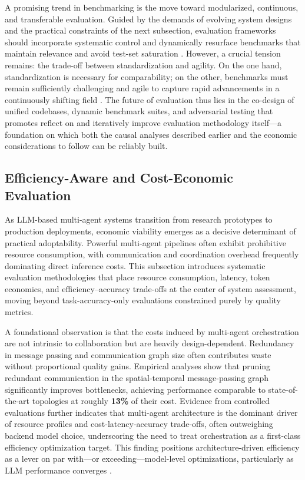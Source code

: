 \documentclass[11pt,a4paper]{article}
\begin{document}
A promising trend in benchmarking is the move toward modularized, continuous, and transferable evaluation. Guided by the demands of evolving system designs and the practical constraints of the next subsection, evaluation frameworks should incorporate systematic control and dynamically resurface benchmarks that maintain relevance and avoid test-set saturation \cite{arxiv:2507.21504v1}. However, a crucial tension remains: the trade-off between standardization and agility. On the one hand, standardization is necessary for comparability; on the other, benchmarks must remain sufficiently challenging and agile to capture rapid advancements in a continuously shifting field \cite{arxiv:2503.16416v2}. The future of evaluation thus lies in the co-design of unified codebases, dynamic benchmark suites, and adversarial testing that promotes reflect on and iteratively improve evaluation methodology itself---a foundation on which both the causal analyses described earlier and the economic considerations to follow can be reliably built.


\subsection{Efficiency-Aware and Cost-Economic Evaluation}


As LLM-based multi-agent systems transition from research prototypes to production deployments, economic viability emerges as a decisive determinant of practical adoptability. Powerful multi-agent pipelines often exhibit prohibitive resource consumption, with communication and coordination overhead frequently dominating direct inference costs. This subsection introduces systematic evaluation methodologies that place resource consumption, latency, token economics, and efficiency--accuracy trade-offs at the center of system assessment, moving beyond task-accuracy-only evaluations constrained purely by quality metrics.

A foundational observation is that the costs induced by multi-agent orchestration are not intrinsic to collaboration but are heavily design-dependent. Redundancy in message passing and communication graph size often contributes waste without proportional quality gains. Empirical analyses \cite{arxiv:2410.02506v1,arxiv:2505.23352v1,arxiv:2602.16873v1} show that pruning redundant communication in the spatial-temporal message-passing graph significantly improves bottlenecks, achieving performance comparable to state-of-the-art topologies at roughly \textbf{13\%} of their cost. Evidence from controlled evaluations \cite{arxiv:2601.00481v1} further indicates that multi-agent architecture is the dominant driver of resource profiles and cost-latency-accuracy trade-offs, often outweighing backend model choice, underscoring the need to treat orchestration as a first-class efficiency optimization target. This finding positions architecture-driven efficiency as a lever on par with---or exceeding---model-level optimizations, particularly as LLM performance converges \cite{arxiv:2606.09498v1}.
\end{document}
